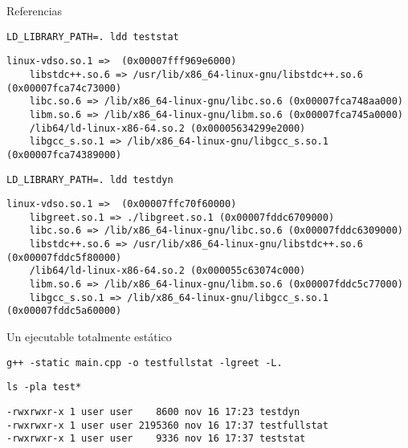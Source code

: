 \begin{frame}[t,fragile]{Referencias}
\begin{lstlisting}[style=terminal,basicstyle=\tiny\ttfamily]
LD_LIBRARY_PATH=. ldd teststat
\end{lstlisting}
\begin{lstlisting}[style=terminal,basicstyle=\tiny\ttfamily]
	linux-vdso.so.1 =>  (0x00007fff969e6000)
	libstdc++.so.6 => /usr/lib/x86_64-linux-gnu/libstdc++.so.6 (0x00007fca74c73000)
	libc.so.6 => /lib/x86_64-linux-gnu/libc.so.6 (0x00007fca748aa000)
	libm.so.6 => /lib/x86_64-linux-gnu/libm.so.6 (0x00007fca745a0000)
	/lib64/ld-linux-x86-64.so.2 (0x00005634299e2000)
	libgcc_s.so.1 => /lib/x86_64-linux-gnu/libgcc_s.so.1 (0x00007fca74389000)
\end{lstlisting}

\vfill
\begin{lstlisting}[style=terminal,basicstyle=\tiny\ttfamily]
LD_LIBRARY_PATH=. ldd testdyn
\end{lstlisting}
\begin{lstlisting}[style=terminal,basicstyle=\tiny\ttfamily]
	linux-vdso.so.1 =>  (0x00007ffc70f60000)
	libgreet.so.1 => ./libgreet.so.1 (0x00007fddc6709000)
	libc.so.6 => /lib/x86_64-linux-gnu/libc.so.6 (0x00007fddc6309000)
	libstdc++.so.6 => /usr/lib/x86_64-linux-gnu/libstdc++.so.6 (0x00007fddc5f80000)
	/lib64/ld-linux-x86-64.so.2 (0x000055c63074c000)
	libm.so.6 => /lib/x86_64-linux-gnu/libm.so.6 (0x00007fddc5c77000)
	libgcc_s.so.1 => /lib/x86_64-linux-gnu/libgcc_s.so.1 (0x00007fddc5a60000)
\end{lstlisting}
\end{frame}

\begin{frame}[t,fragile]{Un ejecutable totalmente estático}
\begin{lstlisting}[style=terminal,basicstyle=\tiny\ttfamily]
g++ -static main.cpp -o testfullstat -lgreet -L.
\end{lstlisting}
\vfill
\begin{lstlisting}[style=terminal,basicstyle=\tiny\ttfamily]
ls -pla test*
\end{lstlisting}
\begin{lstlisting}[style=terminal,basicstyle=\tiny\ttfamily]
-rwxrwxr-x 1 user user    8600 nov 16 17:23 testdyn
-rwxrwxr-x 1 user user 2195360 nov 16 17:37 testfullstat
-rwxrwxr-x 1 user user    9336 nov 16 17:37 teststat
\end{lstlisting}
\end{frame}
